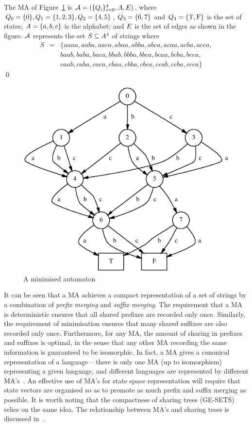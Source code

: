 \begin{exampleb}
The MA of Figure~\ref{fig:ma} is $\MA =
(\{\MAstates_i\}_{i=0}^4,\MAalphabet,\MAtr)$, where $Q_0 =
\{0\}, Q_1 = \{1,2,3\}, Q_2 = \{4,5\}$, $Q_3 =
\{6,7\}$ and $Q_4 = \{\mathrm{T},\mathrm{F}\}$ is the set of states;
$A = \{a,b,c\}$ is the alphabet; and $E$ is the set of edges
as shown in the figure. $\MA$ represents the set $S \subseteq
A^4$ of strings where
\begin{eqnarray*}
S & = & \{aaaa,aaba,aaca,abaa,abba,abca,acaa,acba,acca, \\
&&        baab,baba,baca,bbab,bbba,bbca,bcaa,bcba,bcca, \\
&&        caab,caba,caca,cbaa,cbba,cbca,ccab,ccba,ccca\}
\end{eqnarray*}
\qed  
\end{exampleb}
\begin{figure}
\begin{center}
\includegraphics[width=.8\linewidth]{SGGEN/ma.eps}
\end{center}
\caption{A minimised automaton\label{fig:ma}}
\end{figure}

It can be seen that a MA achieves a compact representation of a set of
strings by a combination of \emph{prefix merging} and \emph{suffix
merging}.  The requirement that a MA is deterministic ensures that all
shared prefixes are recorded only once. Similarly, the requirement of
minimisation ensures that many shared suffixes are also recorded only
once. Furthermore, for any MA, the amount of sharing in prefixes and
suffixes is optimal, in the sense that any other MA recording the same
information is guaranteed to be isomorphic. In fact, a MA gives a canonical
representation of a language -- there is only one MA (up to
isomorphism) representing a given language, and different languages
are represented by different MA's~\cite{hu:79}. An effective use of
MA's for state space representation will require that state vectors
are organised so as to promote as much prefix and suffix merging as
possible.  It is worth noting that the compactness of sharing trees
(GE-SETS) relies on the same idea. The relationship between MA's and
sharing trees is discussed in~\cite{zam:97}.
 
